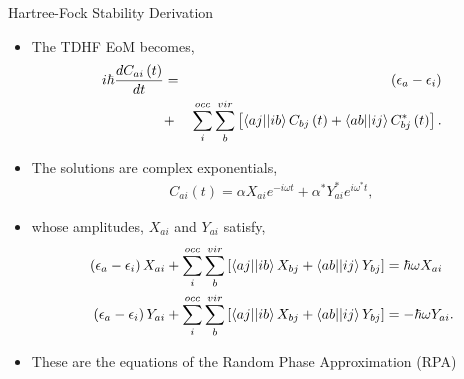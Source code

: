 \documentclass[10pt]{beamer}
\begin{document}
{{{{{{{{{{{{{{{{\begin{frame}{Hartree-Fock Stability Derivation}
	\begin{itemize}[<+->]
		\item[]{The TDHF EoM becomes,
			\begin{eqnarray}
				i\hbar \frac{dC_{ai} \left(t\right) }{dt} &=& \left(\epsilon_a - \epsilon_i \right) 
				\nonumber
					\\ &+& \sum\limits_{i}^{occ}  \sum\limits_{b}^{vir}
					  \left[\braket{aj||ib}C_{bj}   \left( t \right)
						  +\braket{ab||ij}C_{bj}^* \left( t \right) \right].
			\end{eqnarray}
		}
		\item[]{The solutions are complex exponentials,
			\begin{eqnarray}
				C_{ai} \left(t \right)  = \alpha X_{ai} e^{-i \omega t} + \alpha^* Y_{ai}^* e^{i \omega^* 
				t},
			\end{eqnarray}
		}
		\item[]{whose amplitudes, $X_{ai}$ and $Y_{ai}$ satisfy,
			\begin{align}
				\left(\epsilon_a - \epsilon_i \right)X_{ai} + \sum\limits_{i}^{occ}  \sum\limits_{b}^{vir}
					\left[ \braket{aj||ib}X_{bj} + \braket{ab||ij}Y_{bj} \right] &= \hbar \omega X_{ai}
				\nonumber \\
				\left(\epsilon_a - \epsilon_i \right)Y_{ai} + \sum\limits_{i}^{occ}  \sum\limits_{b}^{vir}
					\left[ \braket{aj||ib}X_{bj} + \braket{ab||ij}Y_{bj} \right] &= -\hbar \omega Y_{ai}.
			\end{align}
		}
		\item[]{These are the equations of the Random Phase Approximation (RPA)}
	\end{itemize}
\end{frame}


{%

}}}}}}}}}}}}}}}}}
\end{document}
